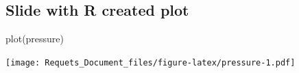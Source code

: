 \documentclass[10pt,]{article}
\newenvironment{Shaded}{}{}
\newcommand{\KeywordTok}[1]{\textcolor[rgb]{0.00,0.00,1.00}{{#1}}}
\newcommand{\NormalTok}[1]{{#1}}
\begin{document}
\subsection{Slide with R created plot}\label{slide-with-r-created-plot}

\begin{Shaded}
\begin{Highlighting}[]
\KeywordTok{plot}\NormalTok{(pressure)}
\end{Highlighting}
\end{Shaded}

\texttt{[image: Requets\_Document\_files/figure-latex/pressure-1.pdf]}
\end{document}
